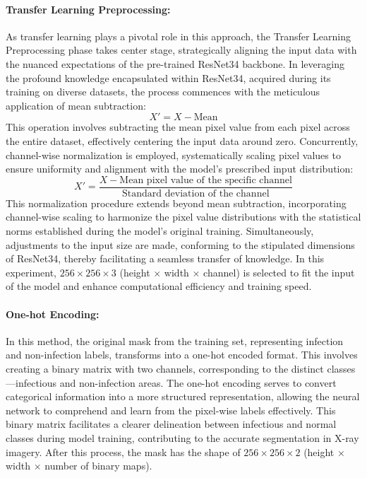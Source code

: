 \documentclass[]{acmsiggraph}
\begin{document}
\paragraph{Transfer Learning Preprocessing:}
As transfer learning plays a pivotal role in this approach, the Transfer Learning Preprocessing phase takes center stage, strategically aligning the input data with the nuanced expectations of the pre-trained ResNet34 backbone. In leveraging the profound knowledge encapsulated within ResNet34, acquired during its training on diverse datasets, the process commences with the meticulous application of mean subtraction:
\[ X' = X - \text{Mean} \]
This operation involves subtracting the mean pixel value from each pixel across the entire dataset, effectively centering the input data around zero. Concurrently, channel-wise normalization is employed, systematically scaling pixel values to ensure uniformity and alignment with the model's prescribed input distribution:
\[ X' = \frac{X - \text{Mean pixel value of the specific channel}}{\text{Standard deviation of the channel}} \]
This normalization procedure extends beyond mean subtraction, incorporating channel-wise scaling to harmonize the pixel value distributions with the statistical norms established during the model's original training. Simultaneously, adjustments to the input size are made, conforming to the stipulated dimensions of ResNet34, thereby facilitating a seamless transfer of knowledge. In this experiment, \(256 \times 256 \times 3\) (height $\times$ width $\times$ channel) is selected to fit the input of the model and enhance computational efficiency and training speed.

\paragraph{One-hot Encoding:}
In this method, the original mask from the training set, representing infection and non-infection labels, transforms into a one-hot encoded format. This involves creating a binary matrix with two channels, corresponding to the distinct classes—infectious and non-infection areas. The one-hot encoding serves to convert categorical information into a more structured representation, allowing the neural network to comprehend and learn from the pixel-wise labels effectively. This binary matrix facilitates a clearer delineation between infectious and normal classes during model training, contributing to the accurate segmentation in X-ray imagery. After this process, the mask has the shape of \(256 \times 256 \times 2\) (height $\times$ width $\times$ number of binary maps).
\end{document}
